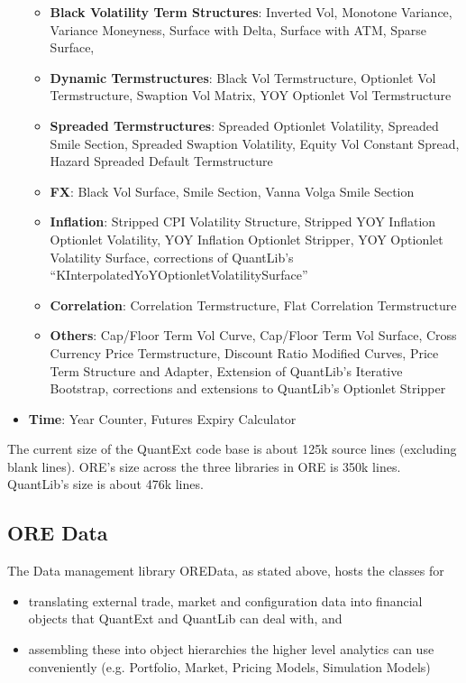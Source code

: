 \documentclass[12pt, a4paper]{report}
\begin{document}
\begin{itemize}
\begin{itemize}
\item {\bf Black Volatility Term Structures}: Inverted Vol, Monotone Variance, Variance Moneyness, Surface with Delta, Surface with ATM, Sparse Surface, 
\item {\bf Dynamic Termstructures}: Black Vol Termstructure, Optionlet Vol Termstructure, Swaption Vol Matrix, YOY Optionlet Vol Termstructure
\item {\bf Spreaded Termstructures}: Spreaded Optionlet Volatility, Spreaded Smile Section, Spreaded Swaption Volatility, Equity Vol Constant Spread, Hazard Spreaded Default Termstructure
\item {\bf FX}: Black Vol Surface, Smile Section, Vanna Volga Smile Section
\item {\bf Inflation}: Stripped CPI Volatility Structure, Stripped YOY Inflation Optionlet Volatility, YOY Inflation Optionlet Stripper, YOY Optionlet Volatility Surface, corrections of QuantLib's ``KInterpolatedYoYOptionletVolatilitySurface''
\item {\bf Correlation}: Correlation Termstructure, Flat Correlation Termstructure
\item {\bf Others}: Cap/Floor Term Vol Curve, Cap/Floor Term Vol Surface, Cross Currency Price Termstructure, Discount Ratio Modified Curves, Price Term Structure and Adapter, Extension of QuantLib's Iterative Bootstrap, corrections and extensions to QuantLib's Optionlet Stripper
\end{itemize}
\item {\bf Time}: Year Counter, Futures Expiry Calculator
\end{itemize}

The current size of the QuantExt code base is about 125k source lines (excluding blank lines). ORE's size across the three libraries in ORE is 350k lines. QuantLib's size is about 476k lines.

\subsection{ORE Data}
The Data management library OREData, as stated above, hosts the classes for
\begin{itemize}
\item translating external trade, market and configuration data into financial objects that QuantExt and QuantLib can deal with, and
\item assembling these into object hierarchies the higher level analytics can use  conveniently (e.g. Portfolio, Market, Pricing Models, Simulation Models)
\end{itemize}
\end{document}
